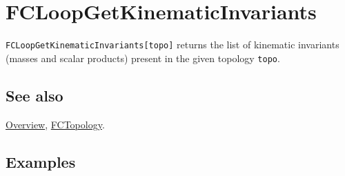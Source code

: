 \documentclass[../FeynCalcManual.tex]{subfiles}
\begin{document}
\begin{Shaded}
\begin{Highlighting}[]
 
\end{Highlighting}
\end{Shaded}

\hypertarget{fcloopgetkinematicinvariants}{
\section{FCLoopGetKinematicInvariants}\label{fcloopgetkinematicinvariants}}

\texttt{FCLoopGetKinematicInvariants[\allowbreak{}topo]} returns the
list of kinematic invariants (masses and scalar products) present in the
given topology \texttt{topo}.

\subsection{See also}

\hyperlink{toc}{Overview}, \hyperlink{fctopology}{FCTopology}.

\subsection{Examples}
\end{document}
